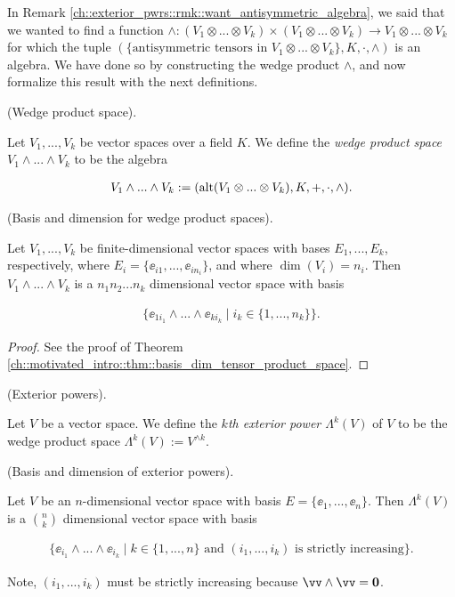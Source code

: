 In Remark \ref{ch::exterior_pwrs::rmk::want_antisymmetric_algebra}, we said that we wanted to find a function $\wedge:(V_1 \otimes ... \otimes V_k) \times (V_1 \otimes ... \otimes V_k) \rightarrow V_1 \otimes ... \otimes V_k$ for which the tuple $(\{\text{antisymmetric tensors in $V_1 \otimes ... \otimes V_k$}\}, K, \cdot, \wedge )$ is an algebra. We have done so by constructing the wedge product $\wedge$, and now formalize this result with the next definitions.

\begin{defn}
    (Wedge product space). 
    
    Let $V_1, ..., V_k$ be vector spaces over a field $K$. We define the \textit{wedge product space} $V_1 \wedge ... \wedge V_k$ to be the algebra 
    
    \begin{align*}
        V_1 \wedge ... \wedge V_k := (\text{alt}(V_1 \otimes ... \otimes V_k), K, +, \cdot, \wedge).
    \end{align*}
\end{defn}

\begin{theorem}
    (Basis and dimension for wedge product spaces).
    
    Let $V_1, ..., V_k$ be finite-dimensional vector spaces with bases $E_1, ..., E_k$, respectively, where $E_i = \{\ee_{i1}, ..., \ee_{in_i}\}$, and where $\dim(V_i) = n_i$. Then $V_1 \wedge ... \wedge V_k$ is a $n_1 n_2 ... n_k$ dimensional vector space with basis
    
    \begin{align*}
        \{ \ee_{1i_1} \wedge ... \wedge \ee_{ki_k} \mid i_k \in \{1, ..., n_k\} \}.
    \end{align*}
\end{theorem}

\begin{proof}
   See the proof of Theorem \ref{ch::motivated_intro::thm::basis_dim_tensor_product_space}.
\end{proof}

\begin{theorem}
    (Exterior powers).
    
    Let $V$ be a vector space. We define the \textit{$k$th exterior power $\Lambda^k(V)$} of $V$ to be the wedge product space $\Lambda^k(V) := V^{\wedge k}$.
\end{theorem}

\begin{theorem}
    (Basis and dimension of exterior powers).
    
    Let $V$ be an $n$-dimensional vector space with basis $E = \{\ee_1, ..., \ee_n\}$. Then $\Lambda^k(V)$ is a $\binom{n}{k}$ dimensional vector space with basis
    
    \begin{align*}
        \{ \ee_{i_1} \wedge ... \wedge \ee_{i_k} \mid k \in \{1, ..., n\} \text{ and } (i_1, ..., i_k) \text{ is strictly increasing} \}.
    \end{align*}
    
    Note, $(i_1, ..., i_k)$ must be strictly increasing because $\vv \wedge \vv = \mathbf{0}$.
\end{theorem}

